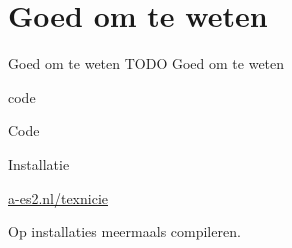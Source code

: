 \documentclass[presentatie.tex]{subfiles}
\begin{document}
\section{Goed om te weten}

\clearrecentlist
    
\begin{frame}{Goed om te weten}
    TODO Goed om te weten
\end{frame}

\begin{saveblock}{code}
	\begin{highlightblock}[gobble=8,linewidth=0.5\textwidth,framexleftmargin=0.25em]
        Code
	\end{highlightblock}
\end{saveblock}

\begin{frame}
    {Installatie}

    \centering\url{a-es2.nl/texnicie}
\end{frame}

\begin{frame}
    Op installaties meermaals compileren.
\end{frame}
\end{document}
